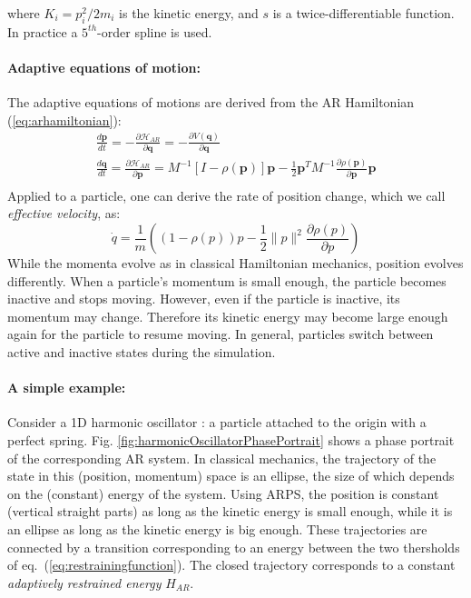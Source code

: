 \documentclass[11pt, oneside, a4paper]{memoir}
\renewcommand{\vec}[1]{\mathbf{#1}}
\newcommand{\vp}{\vec p}
\newcommand{\vq}{\vec q}
\renewcommand{\H}{\mathcal{H}}
\begin{document}
where $K_i=p_i^2/2m_i$ is the kinetic energy, and
$s$ is a twice-differentiable function. In practice a $5^{th}$-order spline is used.
\paragraph*{Adaptive equations of motion:}
The adaptive equations of motions are derived from the AR Hamiltonian (\ref{eq:arhamiltonian}):
$$
    \begin{array}{l}
        \displaystyle \frac{d\vp}{dt} =
        -\frac{\partial \H_{AR}}{\partial \vq} = -\frac{\partial V(\vq)}{\partial \vq} \\
        \displaystyle \frac{d\vq}{dt} =
       \frac{\partial \H_{AR}}{\partial \vp} = M^{-1}[I - \rho(\vp)] \vp
        - \frac{1}{2}\vp^{T}M^{-1}\frac{\partial \rho(\vp)}{\partial \vp}\vp\\
    \end{array}
$$
Applied to a particle, one can derive the rate of position change, which we call \textit{effective velocity}, as:
\begin{equation}
    \label{eq:adaptiveVelocity}
    \dot{q} = \frac{1}{m}\left((1-\rho(p))p - \frac{1}{2}\parallel p \parallel^2\frac{\partial \rho(p)}{\partial p}\right)
\end{equation}
While the momenta evolve as in classical Hamiltonian mechanics, position evolves differently.
When a particle's momentum is small enough, the particle becomes inactive and stops moving.
However, even if the particle is inactive, its momentum may change.
Therefore its kinetic energy may become large enough again for the particle to resume moving.
In general, particles switch between active and inactive states during the simulation.
\paragraph*{A simple example:}
Consider a 1D harmonic oscillator : a particle attached to the origin with a perfect spring.
Fig. \ref{fig:harmonicOscillatorPhasePortrait} shows a phase portrait of the corresponding
AR system.
In classical mechanics, the trajectory of the state in this (position, momentum) space is an ellipse, the size of which depends on the (constant) energy of the system.
Using ARPS, the position is constant (vertical straight parts) as long as the kinetic energy is small enough, while it is an ellipse as long as the kinetic energy is big enough.
These trajectories are connected by a transition corresponding to an energy between the two thersholds of eq.~(\ref{eq:restrainingfunction}).
The closed trajectory corresponds to a constant \textit{adaptively restrained energy} $H_{AR}$.
\end{document}
